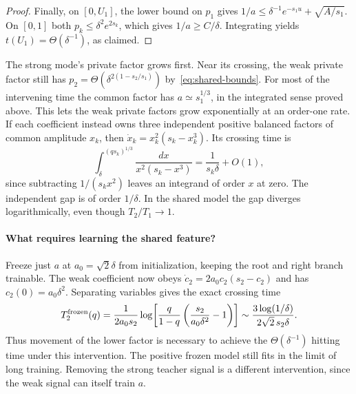 \begin{proof}
Finally, on \([0,U_1]\), the lower bound on \(p_1\) gives
\(1/a\le\delta^{-1}e^{-s_1u}+\sqrt{A/s_1}\). On \([0,1]\) both
\(p_k\le \delta^2e^{2s_k}\), which gives \(1/a\ge C/\delta\).
Integrating yields \(t(U_1)=\Theta(\delta^{-1})\), as claimed.
\end{proof}

The strong mode's private factor grows first. Near its crossing, the weak
private factor still has \(p_2=\Theta(\delta^{2(1-s_2/s_1)})\)
by~\eqref{eq:shared-bounds}. For most of the intervening time the common
factor has \(a\simeq s_1^{1/3}\), in the integrated sense proved above.
This lets the weak private factors grow exponentially at an order-one rate.
If each coefficient instead owns three independent positive balanced factors
of common amplitude \(x_k\), then \(\dot x_k=x_k^2(s_k-x_k^3)\).
Its crossing time is
\[
 \int_\delta^{(q s_k)^{1/3}}\frac{dx}{x^2(s_k-x^3)}
 =\frac{1}{s_k\delta}+O(1),
\]
since subtracting \(1/(s_kx^2)\) leaves an integrand of order \(x\) at
zero. The independent gap is of order \(1/\delta\). In the shared model
the gap diverges logarithmically, even though \(T_2/T_1\to1\).

\paragraph{What requires learning the shared feature?}
Freeze just \(a\) at \(a_0=\sqrt2\delta\) from initialization, keeping
the root and right branch trainable. The weak coefficient now obeys
\(\dot c_2=2a_0 c_2(s_2-c_2)\) and has \(c_2(0)=a_0\delta^2\).
Separating variables gives the exact crossing time
\begin{equation}
 T_2^{\rm frozen}(q)=\frac{1}{2a_0s_2}
 \log\!\left[\frac{q}{1-q}
       \left(\frac{s_2}{a_0\delta^2}-1\right)\right]
 \sim \frac{3\log(1/\delta)}{2\sqrt2\,s_2\delta}.
 \label{eq:shared-frozen}
\end{equation}
Thus movement of the lower factor is necessary to achieve the
\(\Theta(\delta^{-1})\) hitting time under this intervention. The positive
frozen model still fits in the limit of long training. Removing the strong
teacher signal is a different intervention, since the weak signal can itself
train \(a\).

